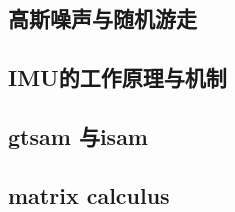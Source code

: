 \documentclass[10pt,a4paper]{article}
\begin{document}
\subsection{高斯噪声与随机游走}
\subsection{IMU的工作原理与机制}
\subsection{gtsam 与isam}
\subsection{matrix calculus}


%
\end{document}
